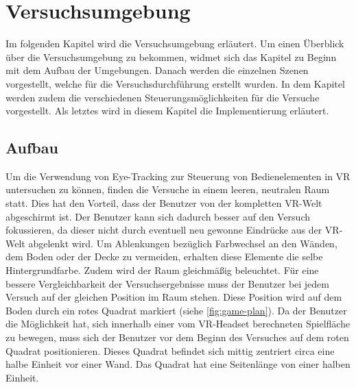 
\chapter{Versuchsumgebung}
\label{section:versuchsumgebung}

Im folgenden Kapitel wird die Versuchsumgebung erläutert. Um einen Überblick über die Versuchsumgebung zu bekommen, widmet sich das Kapitel zu Beginn mit dem Aufbau der Umgebungen. Danach werden die einzelnen Szenen vorgestellt, welche für die Versuchsdurchführung erstellt wurden. In dem Kapitel werden zudem die verschiedenen Steuerungsmöglichkeiten für die Versuche vorgestellt. Als letztes wird in diesem Kapitel die Implementierung erläutert. 

\section{Aufbau}
Um die Verwendung von Eye-Tracking zur Steuerung von Bedienelementen in \ac{VR} untersuchen zu können, finden die Versuche in einem leeren, neutralen Raum statt. Dies hat den Vorteil, dass der Benutzer von der kompletten \ac{VR}-Welt abgeschirmt ist. Der Benutzer kann sich dadurch besser auf den Versuch fokussieren, da dieser nicht durch eventuell neu gewonne Eindrücke aus der \ac{VR}-Welt abgelenkt wird. Um Ablenkungen bezüglich Farbwechsel an den Wänden, dem Boden oder der Decke zu vermeiden, erhalten diese Elemente die selbe Hintergrundfarbe. Zudem wird der Raum gleichmäßig beleuchtet. Für eine bessere Vergleichbarkeit der Versuchsergebnisse muss der Benutzer bei jedem Versuch auf der gleichen Position im Raum stehen. Diese Position wird auf dem Boden durch ein rotes Quadrat markiert (siehe \autoref{fig:game-plan}). Da der Benutzer die Möglichkeit hat, sich innerhalb einer vom \ac{VR}-Headset berechneten Spielfläche zu bewegen, muss sich der Benutzer vor dem Beginn des Versuches auf dem roten Quadrat positionieren. Dieses Quadrat befindet sich mittig zentriert circa eine halbe Einheit vor einer Wand. Das Quadrat hat eine Seitenlänge von einer halben Einheit.

